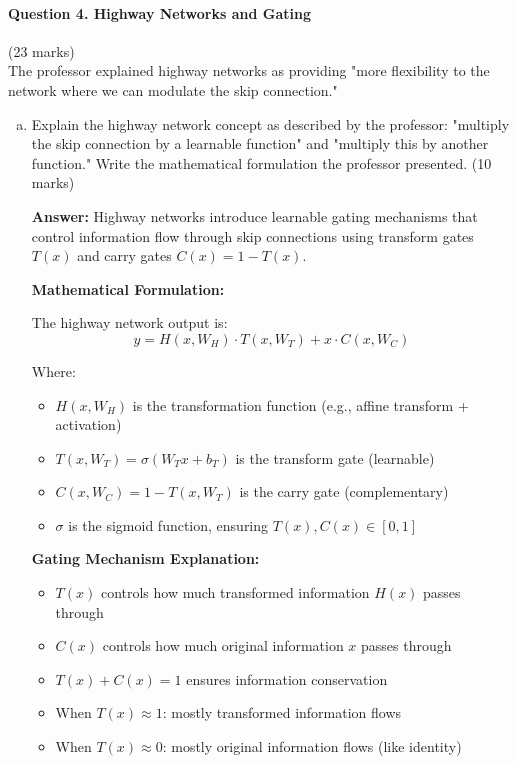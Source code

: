 \documentclass[12pt]{article}
\newcommand{\answer}[1]{{\color{answercolor}\textbf{Answer:} #1}}
\newcommand{\explanation}[1]{{\color{explanationcolor}#1}}
\begin{document}
\newpage
\paragraph{Question 4. Highway Networks and Gating}{\hfill (23 marks)}\\
The professor explained highway networks as providing "more flexibility to the network where we can modulate the skip connection."

\begin{enumerate}[(a)]
    \item Explain the highway network concept as described by the professor: "multiply the skip connection by a learnable function" and "multiply this by another function." Write the mathematical formulation the professor presented. \hfill (10 marks)
    
    \answer{Highway networks introduce learnable gating mechanisms that control information flow through skip connections using transform gates $T(x)$ and carry gates $C(x) = 1 - T(x)$.}
    
    \explanation{
    \textbf{Mathematical Formulation:}
    
    The highway network output is:
    $$y = H(x, W_H) \cdot T(x, W_T) + x \cdot C(x, W_C)$$
    
    Where:
    \begin{itemize}
        \item $H(x, W_H)$ is the transformation function (e.g., affine transform + activation)
        \item $T(x, W_T) = \sigma(W_T x + b_T)$ is the transform gate (learnable)
        \item $C(x, W_C) = 1 - T(x, W_T)$ is the carry gate (complementary)
        \item $\sigma$ is the sigmoid function, ensuring $T(x), C(x) \in [0,1]$
    \end{itemize}
    
    \textbf{Gating Mechanism Explanation:}
    \begin{itemize}
        \item $T(x)$ controls how much transformed information $H(x)$ passes through
        \item $C(x)$ controls how much original information $x$ passes through
        \item $T(x) + C(x) = 1$ ensures information conservation
        \item When $T(x) \approx 1$: mostly transformed information flows
        \item When $T(x) \approx 0$: mostly original information flows (like identity)
    \end{itemize}
    
}
\end{enumerate}
\end{document}

